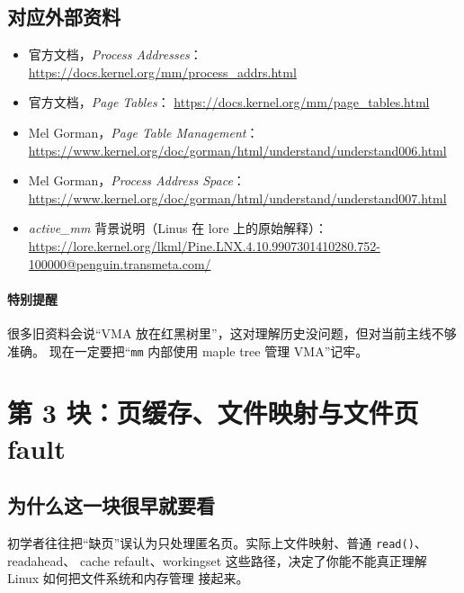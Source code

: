 \documentclass[UTF8,a4paper,11pt]{ctexart}
\begin{document}
\subsection*{对应外部资料}
\begin{itemize}
  \item 官方文档，\textit{Process Addresses}：
  \url{https://docs.kernel.org/mm/process_addrs.html}
  \item 官方文档，\textit{Page Tables}：
  \url{https://docs.kernel.org/mm/page_tables.html}
  \item Mel Gorman，\textit{Page Table Management}：
  \url{https://www.kernel.org/doc/gorman/html/understand/understand006.html}
  \item Mel Gorman，\textit{Process Address Space}：
  \url{https://www.kernel.org/doc/gorman/html/understand/understand007.html}
  \item \textit{active\_mm} 背景说明（Linus 在 lore 上的原始解释）：
  \url{https://lore.kernel.org/lkml/Pine.LNX.4.10.9907301410280.752-100000@penguin.transmeta.com/}
\end{itemize}

\paragraph{特别提醒}
很多旧资料会说“VMA 放在红黑树里”，这对理解历史没问题，但对当前主线不够准确。
现在一定要把“\texttt{mm} 内部使用 maple tree 管理 VMA”记牢。

\section{第 3 块：页缓存、文件映射与文件页 fault}

\subsection*{为什么这一块很早就要看}
初学者往往把“缺页”误认为只处理匿名页。实际上文件映射、普通 \texttt{read()}、readahead、
cache refault、workingset 这些路径，决定了你能不能真正理解 Linux 如何把文件系统和内存管理
接起来。
\end{document}
